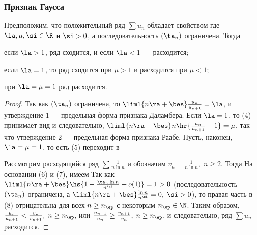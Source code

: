 \documentclass[a4paper]{article}
\begin{document}
\subsubsection{Признак Гаусса}
\begin{theorem}
Предположим, что положительный ряд $\sum u_n$ обладает свойством
 где $\la,\mu,\si\in\R$ и
$\si>0$, а последовательность $(\ta_n)$ ограничена. Тогда
\begin{nums}{-3}
\item если $\la>1$, ряд сходится, и если $\la<1$ --- расходится;
\item если $\la=1$, то ряд сходится при $\mu>1$ и расходится при
$\mu<1$;
\item при $\la=\mu=1$ ряд расходится.
\end{nums}
\end{theorem}

\begin{proof}
Так как $(\ta_n)$ ограничена, то $\liml{n\ra+\bes}
\frac{u_n}{u_{n+1}} = \la$, и утверждение 1 --- предельная форма
признака Даламбера. Если $\la=1$, то (4) принимает вид
 и следовательно,
$\liml{n\ra+\bes}n \hr{\frac{u_n}{u_{n+1}} - 1} = \mu$, так что
утверждение 2 --- предельная форма признака Раабе. Пусть, наконец,
$\la=\mu=1$, то есть (5) переходит в 

Рассмотрим расходящийся ряд $\sum\frac1{n\ln n}$ и обозначим $v_n =
\frac1{n\ln n}, \; n\ge 2.$ Тогда  На основании (6) и (7), имеем
 Так как
$\liml{n\ra+\bes}\hs{1 - \frac{\ta_n \ln n}{n^{\si}} + o(1)}=1>0$
(последовательность $(\ta_n)$ ограничена, а
$\liml{n\ra+\bes}\frac{\ln n}{n^{\si}}=0, \; \si>0$), то правая
часть в (8) отрицательна для всех $n\ge n_{\ep}$ с некоторым
$n_{\ep}\in\N$. Таким образом, $\frac{u_n}{u_{n+1}} <
\frac{v_n}{v_{n+1}}, \; n\ge n_{\ep}$, или $\frac{u_{n+1}}{u_n} \ge
\frac{v_{n+1}}{v_n}, \; n\ge n_{\ep}$, и следовательно, ряд $\sum
u_n$ расходится.
\end{proof}
\end{document}
